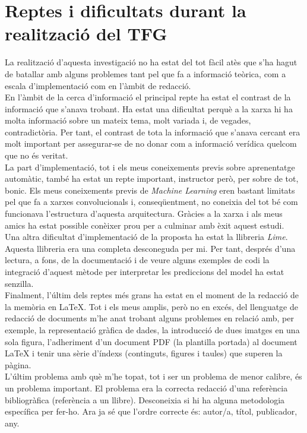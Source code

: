 \documentclass[a4paper,12pt]{article}
\begin{document}
\section*{Reptes i dificultats durant la realització del TFG}
La realització d'aquesta investigació no ha estat del tot fàcil atès que s'ha hagut de batallar amb alguns problemes tant pel que fa a informació teòrica, com a escala d'implementació com en l'àmbit de redacció.\\
En l'àmbit de la cerca d'informació el principal repte ha estat el contrast de la informació que s'anava trobant. Ha estat una dificultat perquè a la xarxa hi ha molta informació sobre un mateix tema, molt variada i, de vegades, contradictòria. Per tant, el contrast de tota la informació que s'anava cercant era molt important per assegurar-se de no donar com a informació verídica quelcom que no és veritat.\\
La part d'implementació, tot i els meus coneixements previs sobre aprenentatge automàtic, també ha estat un repte important, instructor però, per sobre de tot, bonic. Els meus coneixements previs de \textit{Machine Learning} eren bastant limitats pel que fa a xarxes convolucionals i, conseqüentment, no coneixia del tot bé com funcionava l'estructura d'aquesta arquitectura. Gràcies a la xarxa i als meus amics ha estat possible conèixer prou per a culminar amb èxit aquest estudi.\\
Una altra dificultat d'implementació de la proposta ha estat la llibreria \textit{Lime}. Aquesta llibreria era una completa desconeguda per mi. Per tant, després d'una lectura, a fons, de la documentació i de veure alguns exemples de codi la integració d'aquest mètode per interpretar les prediccions del model ha estat senzilla.\\
Finalment, l'últim dels reptes més grans ha estat en el moment de la redacció de la memòria en LaTeX. Tot i els meus amplis, però no en excés, del llenguatge de redacció de documents m'he anat trobant alguns problemes en relació amb, per exemple, la representació gràfica de dades, la introducció de dues imatges en una sola figura, l'adheriment d'un document PDF (la plantilla portada) al document LaTeX i tenir una sèrie d'índexs (continguts, figures i taules) que superen la pàgina.\\
L'últim problema amb què m'he topat, tot i ser un problema de menor calibre, és un problema important. El problema era la correcta redacció d'una referència bibliogràfica (referència a un llibre). Desconeixia si hi ha alguna metodologia específica per fer-ho. Ara ja sé que l'ordre correcte és: autor/a, títol, publicador, any.
\end{document}
